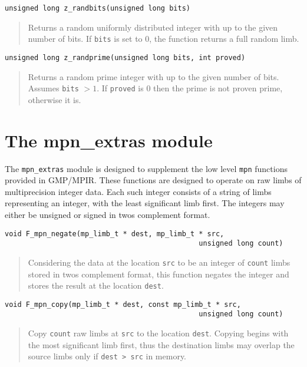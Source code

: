 \documentclass[a4paper,10pt]{article}
\newcommand{\code}{\lstinline}
\begin{document}
\begin{lstlisting}
unsigned long z_randbits(unsigned long bits)
\end{lstlisting}
\begin{quote}
Returns a random uniformly distributed integer with up to the given number of bits. If \code{bits} is set to 0, the function returns a full random limb.
\end{quote}

\begin{lstlisting}
unsigned long z_randprime(unsigned long bits, int proved)
\end{lstlisting}
\begin{quote}
Returns a random prime integer with up to the given number of bits.  Assumes \code{bits} $> 1$. If \code{proved} is 0 then the prime is not proven prime, otherwise it is.
\end{quote}

\section{The mpn\_extras module}

The \code{mpn_extras} module is designed to supplement the low level \code{mpn} functions provided in GMP/MPIR. These functions are designed to operate on raw limbs of multiprecision integer data. Each such integer consists of a string of limbs representing an integer, with the least significant limb first. The integers may either be unsigned or signed in twos complement format.

\begin{lstlisting}
void F_mpn_negate(mp_limb_t * dest, mp_limb_t * src, 
                                              unsigned long count)
\end{lstlisting}
\begin{quote}
Considering the data at the location \code{src} to be an integer of \code{count} limbs stored in twos complement format, this function negates the integer and stores the result at the location \code{dest}.
\end{quote}

\begin{lstlisting}
void F_mpn_copy(mp_limb_t * dest, const mp_limb_t * src, 
                                              unsigned long count)
\end{lstlisting}
\begin{quote}
Copy \code{count} raw limbs at \code{src} to the location \code{dest}. Copying begins with the most significant limb first, thus the destination limbs may overlap the source limbs only if \code{dest > src} in memory.
\end{quote}
\end{document}
